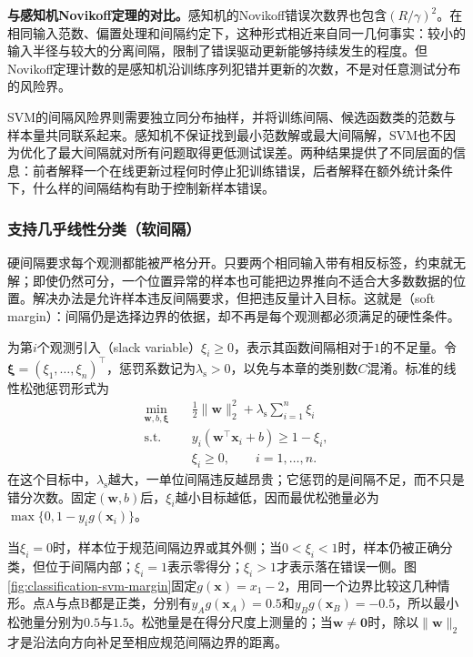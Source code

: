 \label{sec:classification-svm-perceptron-comparison}

\textbf{与感知机Novikoff定理的对比。}感知机的Novikoff错误次数界也包含$(R/\gamma)^2$。在相同输入范数、偏置处理和间隔约定下，这种形式相近来自同一几何事实：较小的输入半径与较大的分离间隔，限制了错误驱动更新能够持续发生的程度。但Novikoff定理计数的是感知机沿训练序列犯错并更新的次数，不是对任意测试分布的风险界。

SVM的间隔风险界则需要独立同分布抽样，并将训练间隔、候选函数类的范数与样本量共同联系起来。感知机不保证找到最小范数解或最大间隔解，SVM也不因为优化了最大间隔就对所有问题取得更低测试误差。两种结果提供了不同层面的信息：前者解释一个在线更新过程何时停止犯训练错误，后者解释在额外统计条件下，什么样的间隔结构有助于控制新样本错误。

\subsubsection{支持几乎线性分类（软间隔）}
\label{sec:classification-svm-soft-margin}

硬间隔要求每个观测都能被严格分开。只要两个相同输入带有相反标签，约束就无解；即使仍然可分，一个位置异常的样本也可能把边界推向不适合大多数数据的位置。解决办法是允许样本违反间隔要求，但把违反量计入目标。这就是（soft margin）：间隔仍是选择边界的依据，却不再是每个观测都必须满足的硬性条件。

为第$i$个观测引入（slack variable）$\xi_i\ge0$，表示其函数间隔相对于$1$的不足量。令$\bm{\xi}=(\xi_1,\ldots,\xi_n)^{\top}$，惩罚系数记为$\lambda_{\mathrm{s}}>0$，以免与本章的类别数$C$混淆。标准的线性松弛惩罚形式为
\begin{equation}
  \begin{aligned}
    \min_{\bm{w},b,\bm{\xi}}\quad&
      \frac12\lVert\bm{w}\rVert_2^2
       +\lambda_{\mathrm{s}}\sum_{i=1}^n\xi_i\\
    \text{s.t.}\quad&
      y_i(\bm{w}^{\top}\bm{x}_i+b)\ge1-\xi_i,\\
    &\xi_i\ge0,\qquad i=1,\ldots,n.
  \end{aligned}
  \label{eq:classification-svm-soft-primal}
\end{equation}
在这个目标中，$\lambda_{\mathrm{s}}$越大，一单位间隔违反越昂贵；它惩罚的是间隔不足，而不只是错分次数。固定$(\bm{w},b)$后，$\xi_i$越小目标越低，因而最优松弛量必为$\max\{0,1-y_i g(\bm{x}_i)\}$。

当$\xi_i=0$时，样本位于规范间隔边界或其外侧；当$0<\xi_i<1$时，样本仍被正确分类，但位于间隔内部；$\xi_i=1$表示零得分；$\xi_i>1$才表示落在错误一侧。图\ref{fig:classification-svm-margin}固定$g(\bm{x})=x_1-2$，用同一个边界比较这几种情形。点A与点B都是正类，分别有$y_Ag(\bm{x}_A)=0.5$和$y_Bg(\bm{x}_B)=-0.5$，所以最小松弛量分别为$0.5$与$1.5$。松弛量是在得分尺度上测量的；当$\bm{w}\ne\bm{0}$时，除以$\lVert\bm{w}\rVert_2$才是沿法向方向补足至相应规范间隔边界的距离。

